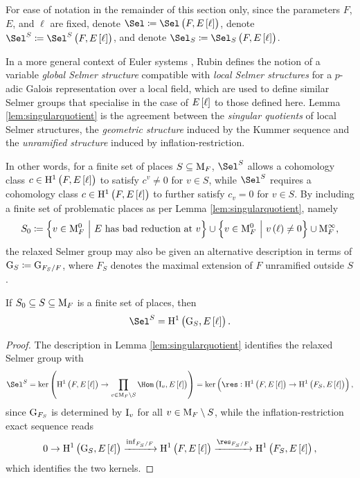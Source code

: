 \begin{notation}
For ease of notation in the remainder of this section only, since the parameters $ F $, $ E $, and $ \ell $ are fixed, denote $ \Sel \coloneqq \Sel\br{F, E\sbr{\ell}} $, denote $ \Sel^S \coloneqq \Sel^S\br{F, E\sbr{\ell}} $, and denote $ \Sel_S \coloneqq \Sel_S\br{F, E\sbr{\ell}} $.
\end{notation}

\begin{remark}
In a more general context of Euler systems \cite[Chapter I]{Rub00}, Rubin defines the notion of a variable \emph{global Selmer structure} compatible with \emph{local Selmer structures} for a $ p $-adic Galois representation over a local field, which are used to define similar Selmer groups that specialise in the case of $ E\sbr{\ell} $ to those defined here. Lemma \ref{lem:singularquotient} is the agreement between the \emph{singular quotients} of local Selmer structures, the \emph{geometric structure} induced by the Kummer sequence and the \emph{unramified structure} induced by inflation-restriction.
\end{remark}

\pagebreak

In other words, for a finite set of places $ S \subseteq \mathrm{M}_F $, $ \Sel^S $ allows a cohomology class $ c \in \H^1\br{F, E\sbr{\ell}} $ to satisfy $ c^v \ne 0 $ for $ v \in S $, while $ \Sel^S $ requires a cohomology class $ c \in \H^1\br{F, E\sbr{\ell}} $ to further satisfy $ c_v = 0 $ for $ v \in S $. By including a finite set of problematic places as per Lemma \ref{lem:singularquotient}, namely
$$ S_0 \coloneqq \cbr{v \in \M_F^0 \st E \ \text{has bad reduction at} \ v} \cup \cbr{v \in \M_F^0 \st v\br{\ell} \ne 0} \cup \M_F^\infty, $$
the relaxed Selmer group may also be given an alternative description in terms of $ \mathrm{G}_S \coloneqq \mathrm{G}_{F_S / F} $, where $ F_S $ denotes the maximal extension of $ F $ unramified outside $ S $.

\begin{lemma}
\label{lem:relaxedselmer}
If $ S_0 \subseteq S \subseteq \mathrm{M}_F $ is a finite set of places, then
$$ \Sel^S = \H^1\br{\G_S, E\sbr{\ell}}. $$
\end{lemma}

\begin{proof}
The description in Lemma \ref{lem:singularquotient} identifies the relaxed Selmer group with
$$ \Sel^S = \ker \br{\H^1\br{F, E\sbr{\ell}} \to \prod_{v \in \M_F \setminus S} \Hom\br{\I_v, E\sbr{\ell}}} = \ker \br{\res : \H^1\br{F, E\sbr{\ell}} \to \H^1\br{F_S, E\sbr{\ell}}}, $$
since $ \mathrm{G}_{F_S} $ is determined by $ \mathrm{I}_v $ for all $ v \in \mathrm{M}_F \setminus S $, while the inflation-restriction exact sequence reads
$$ 0 \to \H^1\br{\G_S, E\sbr{\ell}} \xrightarrow{\inf_{F_S / F}} \H^1\br{F, E\sbr{\ell}} \xrightarrow{\res_{F_S / F}} \H^1\br{F_S, E\sbr{\ell}}, $$
which identifies the two kernels.
\end{proof}

